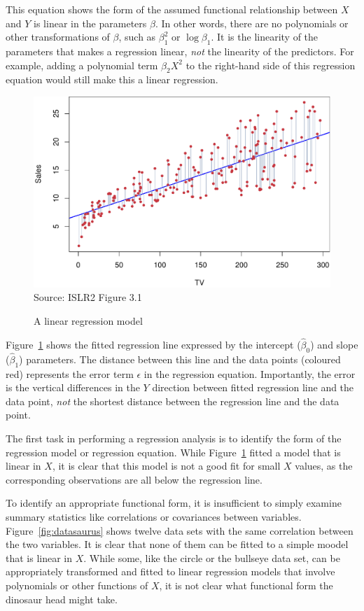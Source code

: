 This equation shows the form of the assumed functional relationship between $X$ and $Y$ is linear in the parameters $\beta$. In other words, there are no polynomials or other transformations of $\beta$, such as $\beta_1^2$ or $\log \beta_1$. It is the linearity of the parameters that makes a regression linear, \emph{not} the linearity of the predictors. For example, adding a polynomial term $\beta_2 X^2$ to the right-hand side of this regression equation would still make this a linear regression. 

\begin{figure}
\centering

\includegraphics[width=.8\textwidth]{../class11/Figures_Chapters_1-6/Chapter3/3_1.pdf} \\

\scriptsize Source: ISLR2 Figure 3.1
\caption{A linear regression model}
\label{fig:regression_chap12}
\end{figure}

Figure~\ref{fig:regression_chap12} shows the fitted regression line expressed by the intercept ($\hat{\beta}_0$) and slope ($\hat{\beta}_1$) parameters. The distance between this line and the data points (coloured red) represents the error term $\epsilon$ in the regression equation. Importantly, the error is the vertical differences in the $Y$ direction between fitted regression line and the data point, \emph{not} the shortest distance between the regression line and the data point. 

The first task in performing a regression analysis is to identify the form of the regression model or regression equation. While Figure~\ref{fig:regression_chap12} fitted a model that is linear in $X$, it is clear that this model is not a good fit for small $X$ values, as the corresponding observations are all below the regression line. 

To identify an appropriate functional form, it is insufficient to simply examine summary statistics like correlations or covariances between variables. Figure~\ref{fig:datasaurus} shows twelve data sets with the same correlation between the two variables. It is clear that none of them can be fitted to a simple moodel that is linear in $X$. While some, like the circle or the bullseye data set, can be appropriately transformed and fitted to linear regression models that involve polynomials or other functions of $X$, it is not clear what functional form the dinosaur head might take.

